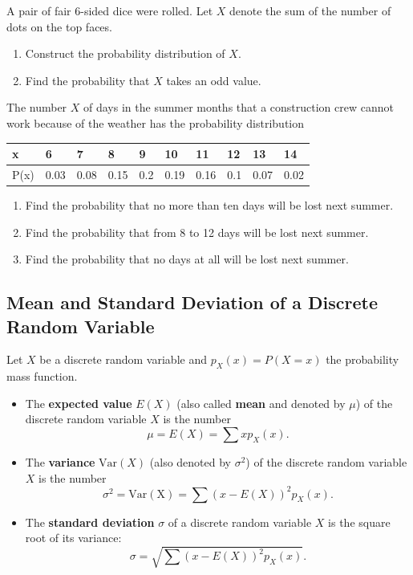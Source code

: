 \begin{exercise}

A pair of fair 6-sided dice were rolled. Let \(X\) denote the sum of the
number of dots on the top faces.

\begin{enumerate}
\item
  Construct the probability distribution of \(X\).
\item
  Find the probability that \(X\) takes an odd value.
\end{enumerate}

\end{exercise}

\begin{exercise}

The number \(X\) of days in the summer months that a construction crew
cannot work because of the weather has the probability distribution

\begin{longtable}[]{@{}llllllllll@{}}
\toprule()
x & 6 & 7 & 8 & 9 & 10 & 11 & 12 & 13 & 14 \\
\midrule()
\endhead
P(x) & 0.03 & 0.08 & 0.15 & 0.2 & 0.19 & 0.16 & 0.1 & 0.07 & 0.02 \\
\bottomrule()
\end{longtable}

\begin{enumerate}
\item
  Find the probability that no more than ten days will be lost next
  summer.
\item
  Find the probability that from 8 to 12 days will be lost next summer.
\item
  Find the probability that no days at all will be lost next summer.
\end{enumerate}

\end{exercise}

\hypertarget{mean-and-standard-deviation-of-a-discrete-random-variable}{%
\subsection{Mean and Standard Deviation of a Discrete Random
Variable}\label{mean-and-standard-deviation-of-a-discrete-random-variable}}

Let \(X\) be a discrete random variable and \(p_X(x)=P(X=x)\) the
probability mass function.

\begin{itemize}
\item
  The \textbf{expected value} \(E(X)\) (also called \textbf{mean} and
  denoted by \(\mu\)) of the discrete random variable \(X\) is the
  number \[\mu=E(X)=\sum xp_X(x).\]
\item
  The \textbf{variance} \(\mathrm{Var}(X)\) (also denoted by
  \(\sigma^2\)) of the discrete random variable \(X\) is the number
  \[\sigma^2=\mathrm{Var(X)}=\sum (x-E(X))^2p_X(x).\]
\item
  The \textbf{standard deviation} \(\sigma\) of a discrete random
  variable \(X\) is the square root of its variance:
  \[\sigma=\sqrt{\sum (x-E(X))^2p_X(x)}.\]
\end{itemize}

